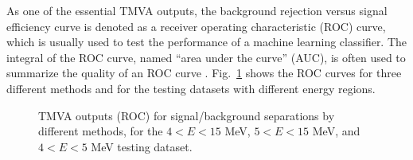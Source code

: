 As one of the essential TMVA outputs, the background rejection versus signal efficiency curve is denoted as a receiver operating characteristic (ROC) curve, which is usually used to test the performance of a machine learning classifier. The integral of the ROC curve, named ``area under the curve'' (AUC), is often used to summarize the quality of an ROC curve \cite{murphy2012machine}. Fig.~\ref{fig:energyVsROC} shows the ROC curves for three different methods and for the testing datasets with different energy regions.

\begin{figure}[htbp]
	\centering
	\caption[TMVA outputs (ROC) for signal/background separations by different methods.]{TMVA outputs (ROC) for signal/background separations by different methods, for the $4<E<15$ MeV, $5<E<15$ MeV, and $4<E<5$ MeV testing dataset.\label{fig:energyVsROC}}
\end{figure}

